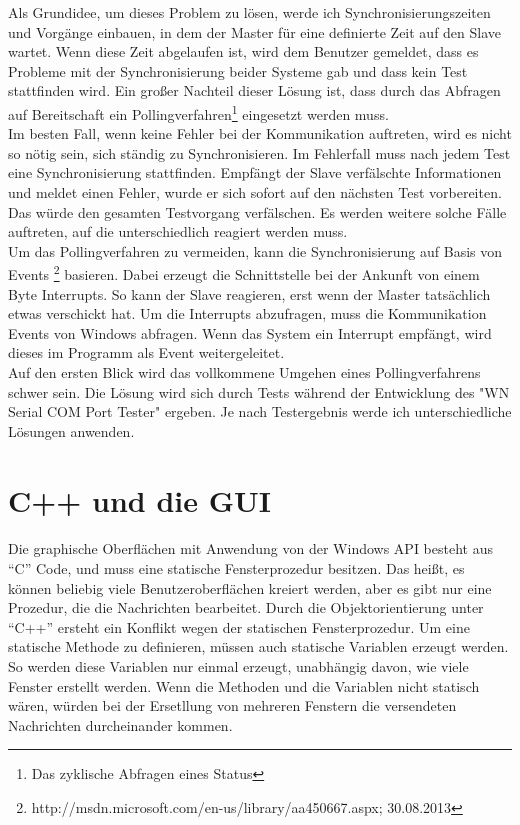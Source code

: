 Als Grundidee, um dieses Problem zu lösen, werde ich Synchronisierungszeiten und Vorgänge einbauen, in dem der Master für eine definierte Zeit auf den Slave wartet. Wenn diese Zeit abgelaufen ist, wird dem Benutzer gemeldet, dass es Probleme mit der Synchronisierung beider Systeme gab und dass kein Test stattfinden wird. Ein großer Nachteil dieser Lösung ist, dass durch das Abfragen auf Bereitschaft ein Pollingverfahren\footnote{Das zyklische Abfragen eines Status} eingesetzt werden muss. \\


Im besten Fall, wenn keine Fehler bei der Kommunikation auftreten, wird es nicht so nötig sein, sich ständig zu Synchronisieren. Im Fehlerfall muss nach jedem Test eine Synchronisierung stattfinden. Empfängt der Slave verfälschte Informationen und meldet einen Fehler, wurde er sich sofort auf den nächsten Test vorbereiten. Das würde den gesamten Testvorgang verfälschen. Es werden weitere solche Fälle auftreten, auf die unterschiedlich  reagiert werden muss.\\


Um das Pollingverfahren zu vermeiden, kann die Synchronisierung auf Basis von Events \footnote{http://msdn.microsoft.com/en-us/library/aa450667.aspx; 30.08.2013} basieren. Dabei erzeugt die Schnittstelle bei der Ankunft von einem Byte Interrupts. So kann der Slave reagieren, erst wenn der Master tatsächlich etwas verschickt hat. Um die Interrupts abzufragen, muss die Kommunikation Events von Windows abfragen. Wenn das System ein Interrupt empfängt, wird dieses im Programm als Event weitergeleitet.\\


Auf den ersten Blick wird das vollkommene Umgehen eines Pollingverfahrens schwer sein. Die Lösung wird sich durch Tests während der Entwicklung des "WN Serial COM Port Tester" ergeben. Je nach Testergebnis werde ich unterschiedliche Lösungen anwenden.



\section{C++ und die GUI}\label{C++GUILoesung}
\paragraph{}
Die graphische Oberflächen mit Anwendung von der Windows API besteht aus "`C"' Code, und muss eine statische Fensterprozedur besitzen. Das heißt, es können beliebig viele Benutzeroberflächen kreiert werden, aber es gibt nur eine Prozedur, die die Nachrichten bearbeitet. Durch die Objektorientierung unter "`C++"' ersteht ein Konflikt wegen der statischen Fensterprozedur. Um eine statische Methode zu definieren, müssen auch statische Variablen erzeugt werden. So werden diese Variablen nur einmal erzeugt, unabhängig davon, wie viele Fenster erstellt werden. Wenn die Methoden und die Variablen nicht statisch wären, würden bei der Ersetllung von mehreren Fenstern die versendeten Nachrichten durcheinander kommen.\\


